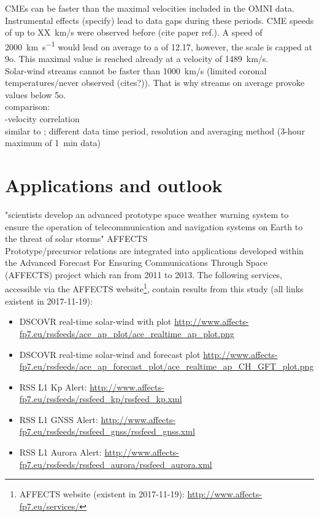CMEs can be faster than the maximal velocities included in the OMNI data. Instrumental effects (specify) lead to data gaps during these periods. CME speeds of up to XX~km/s were observed before (cite paper ref.). A speed of \SI{2000}{\km\per\s} would lead on average to a \Kp{} of 12.17, however, the \Kp{} scale is capped at 9o. This maximal value is reached already at a velocity of 1489~km/s.\\

Solar-wind streams cannot be faster than 1000~km/s (limited coronal temperatures/never observed (cites?)). That is why streams on average provoke \Kp{} values below 5o.\\

comparison:\\
\Kp-velocity correlation\\
similar to \citet{Elliott2013}; different data time period, resolution and averaging method (3-hour maximum of 1~min data)\\


\section{Applications and outlook}

"scientists develop an advanced prototype space weather warning system to ensure the operation of telecommunication and navigation systems on Earth to the threat of solar storms" AFFECTS\\

Prototype/precursor relations are integrated into applications developed within the Advanced Forecast For Ensuring Communications Through Space (\mbox{AFFECTS}) project which ran from 2011 to 2013. The following services, accessible via the \mbox{AFFECTS} website\footnote{AFFECTS website (existent in 2017-11-19): \url{http://www.affects-fp7.eu/services/}}, contain results from this \Kp{} study (all links existent in 2017-11-19):
\begin{itemize}
	\item DSCOVR real-time solar-wind with \Kp{} plot \url{http://www.affects-fp7.eu/rssfeeds/ace_ap_plot/ace_realtime_ap_plot.png}
	\item DSCOVR real-time solar-wind and \Kp{} forecast plot \url{http://www.affects-fp7.eu/rssfeeds/ace_ap_forecast_plot/ace_realtime_ap_CH_GFT_plot.png}
	\item RSS L1 Kp Alert: \url{http://www.affects-fp7.eu/rssfeeds/rssfeed_kp/rssfeed_kp.xml}
	\item RSS L1 GNSS Alert: \url{http://www.affects-fp7.eu/rssfeeds/rssfeed_gnss/rssfeed_gnss.xml}
	\item RSS L1 Aurora Alert: \url{http://www.affects-fp7.eu/rssfeeds/rssfeed_aurora/rssfeed_aurora.xml}
\end{itemize}

